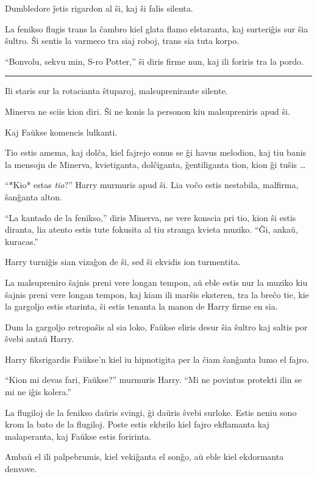 Dumbledore ĵetis rigardon al ŝi, kaj ŝi falis silenta.

La fenikso flugis trans la ĉambro kiel glata flamo elstaranta, kaj
surteriĝis sur ŝia ŝultro. Ŝi sentis la varmeco tra siaj roboj, trans
sia tuta korpo.

``Bonvolu, sekvu min, S-ro Potter,'' ŝi diris firme nun, kaj ili
foriris tra la pordo.

\begin{center}\rule{3in}{0.4pt}\end{center}

Ili staris sur la rotacianta ŝtuparoj, malsuprenirante silente.

Minerva ne sciis kion diri. Ŝi ne konis la personon kiu malsupreniris apud ŝi.

Kaj Faŭkse komencis lulkanti.

Tio estis amema, kaj dolĉa, kiel fajrejo sonus se ĝi havus melodion,
kaj tiu banis la mensojn de Minerva, kvietiganta, dolĉiganta,
ĝentiliganta tion, kion ĝi tuŝis \ldots

``*Kio* estas \emph{tio}?'' Harry murmuris apud ŝi. Lia voĉo estis
nestabila, malfirma, ŝanĝanta alton.

``La kantado de la fenikso,'' diris Minerva, ne vere konscia pri tio,
kion ŝi estis diranta, lia atento estis tute fokusita al tiu stranga
kvieta muziko. ``Ĝi, ankaŭ, kuracas.''

Harry turniĝis sian vizaĝon de ŝi, sed ŝi ekvidis ion turmentita.

La malsupreniro ŝajnis preni vere longan tempon, aŭ eble estis nur la
muziko kiu ŝajnis preni vere longan tempon, kaj kiam ili marŝis
eksteren, tra la breĉo tie, kie la gargoljo estis starinta, ŝi estis
tenanta la manon de Harry firme en sia.

Dum la gargoljo retropaŝis al sia loko, Faŭkse eliris desur ŝia ŝultro
kaj saltis por ŝvebi antaŭ Harry.

Harry fiksrigardis Faŭkse'n kiel iu hipnotigita per la ĉiam ŝanĝanta
lumo el fajro.

``Kion mi devas fari, Faŭkse?'' murmuris Harry. ``Mi ne povintus
protekti ilin se mi ne iĝis kolera.''

La flugiloj de la fenikso daŭris svingi, ĝi daŭris ŝvebi
surloke. Estis neniu sono krom la bato de la flugiloj. Poste estis
ekbrilo kiel fajro ekflamanta kaj malaperanta, kaj Faŭkse estis
foririnta.

Ambaŭ el ili palpebrumis, kiel vekiĝanta el sonĝo, aŭ eble kiel ekdormanta
denvove.

